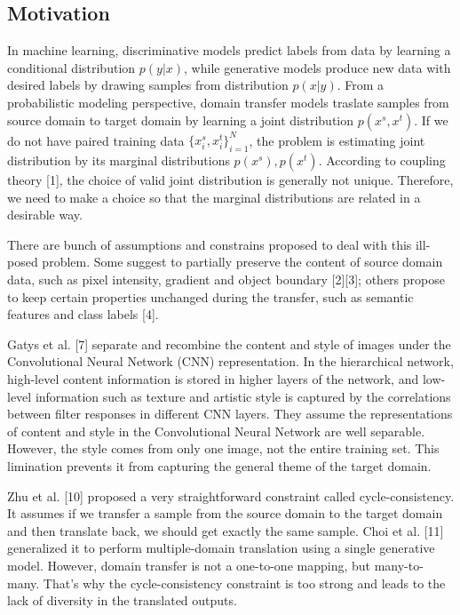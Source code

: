 \documentclass{article}
\begin{document}
\subsection{Motivation} %
In machine learning, discriminative models predict labels from data by learning a conditional distribution $p(y|x)$, while generative models produce new data with desired labels by drawing samples from distribution $p(x|y)$. From a probabilistic modeling perspective, domain transfer models traslate samples from source domain to target domain by learning a joint distribution $p(x^s, x^t)$. If we do not have paired training data $\{{x_i^s, x_i^t\}}_{i=1}^N$, the problem is estimating joint distribution by its marginal distributions $p(x^s), p(x^t)$. According to coupling theory [1], the choice of valid joint distribution is generally not unique. Therefore, we need to make a choice so that the marginal distributions are related in a desirable way.

There are bunch of assumptions and constrains proposed to deal with this ill-posed problem. Some suggest to partially preserve the content of source domain data, such as pixel intensity, gradient and object boundary [2][3]; others propose to keep certain properties unchanged during the transfer, such as semantic features and class labels [4].

Gatys et al. [7] separate and recombine the content and style of images under the Convolutional Neural Network (CNN) representation. In the hierarchical network, high-level content information is stored in higher layers of the network, and low-level information such as texture and artistic style is captured by the correlations between filter responses in different CNN layers. They assume the representations of content and style in the Convolutional Neural Network are well separable. However, the style comes from only one image, not the entire training set. This limination prevents it from capturing the general theme of the target domain.

Zhu et al. [10] proposed a very straightforward constraint called cycle-consistency. It assumes if we transfer a sample from the source domain to the target domain and then translate back, we should get exactly the same sample. Choi et al. [11] generalized it to perform multiple-domain translation using a single generative model. However, domain transfer is not a one-to-one mapping, but many-to-many. That's why the cycle-consistency constraint is too strong and leads to the lack of diversity in the translated outputs.
\end{document}
